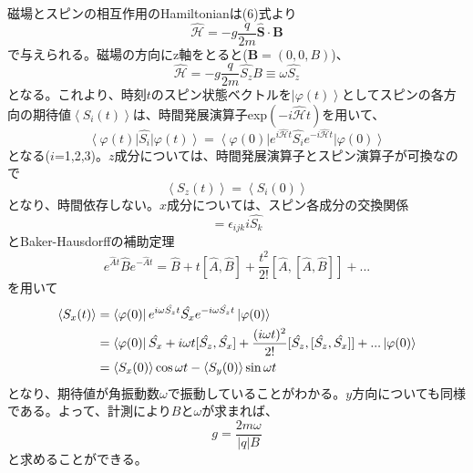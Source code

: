 磁場とスピンの相互作用のHamiltonianは(6)式より
\begin{equation}
\mathcal{\hat{H}}=-g\frac{q}{2m}\bm{\hat{S}}\cdot\bm{B}
\end{equation}
で与えられる。磁場の方向にz軸をとると($\bm{B}=(0,0,B)$)、
\begin{equation}
\mathcal{\hat{H}}=-g\frac{q}{2m}\hat{S_z}{B}\equiv\omega\hat{S_z}
\end{equation}
となる。これより、時刻$t$のスピン状態ベクトルを$\left|\varphi(t)\right\rangle$としてスピンの各方向の期待値$\left\langle S_i(t)\right\rangle$は、時間発展演算子exp$(-i\mathcal{\hat{H}}t)$を用いて、
\begin{equation}
\left\langle\varphi(t)\right|\hat{S_i}\left|\varphi(t)\right\rangle=\left\langle\varphi(0)\right|e^{i\mathcal{\hat{H}}t}\hat{S_i}e^{-i\mathcal{\hat{H}}t}\left|\varphi(0)\right\rangle
\end{equation}
となる($i$=1,2,3)。$z$成分については、時間発展演算子とスピン演算子が可換なので
\begin{equation}
\left\langle S_z(t)\right\rangle=\left\langle S_i(0)\right\rangle
\end{equation}
となり、時間依存しない。$x$成分については、スピン各成分の交換関係
\begin{equation}
[\hat{S_i},\hat{S_j}]=\epsilon_{ijk}i\hat{S_k}
\end{equation}
とBaker-Hausdorffの補助定理
\begin{equation}
e^{\hat{A}t}\hat{B}e^{-\hat{A}t}=\hat{B}+t[\hat{A},\hat{B}]+\frac{t^2}{2!}[\hat{A},[\hat{A},\hat{B}]]+...
\end{equation}
を用いて
\begin{align}
\left\langle S_x(t)\right\rangle &=\left\langle\varphi(0)\right|e^{i\omega\hat{S_z}t}\hat{S_x}e^{-i\omega\hat{S_z}t}\left|\varphi(0)\right\rangle\notag \\
&=\left\langle\varphi(0)\right|\hat{S_x}+i\omega t[\hat{S_z},\hat{S_x}]+\frac{(i\omega t)^2}{2!}[\hat{S_z},[\hat{S_z},\hat{S_x}]]+...\left|\varphi(0)\right\rangle\notag \\
&=\left\langle S_x(0)\right\rangle\cos\omega t-\left\langle S_y(0)\right\rangle\sin\omega t
\end{align}
となり、期待値が角振動数$\omega$で振動していることがわかる。$y$方向についても同様である。よって、計測により$B$と$\omega$が求まれば、
\begin{equation}
g=\frac{2m\omega}{|q|B}
\end{equation}
と求めることができる。

